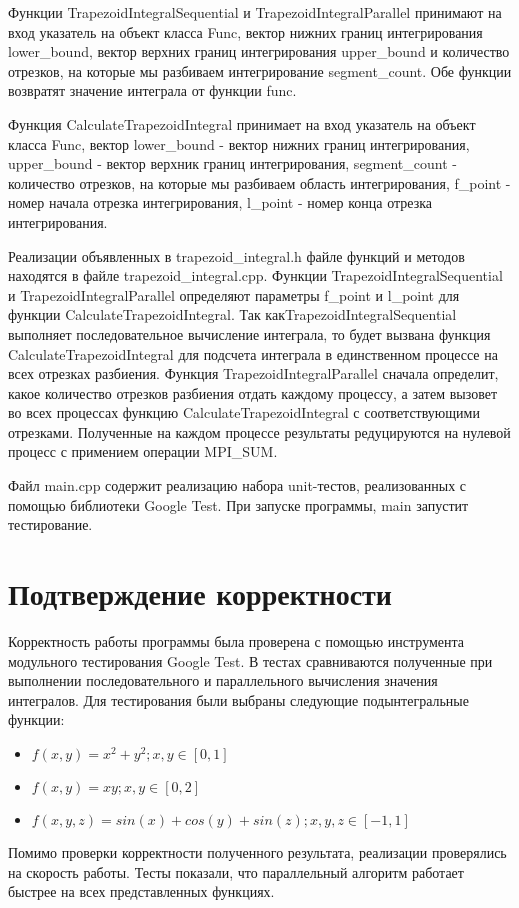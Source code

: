 \documentclass{report}
\begin{document}
Функции TrapezoidIntegralSequential и TrapezoidIntegralParallel принимают на вход указатель на объект класса Func, вектор нижних границ интегрирования lower\_bound, вектор верхних границ интегрирования upper\_bound и количество отрезков, на которые мы разбиваем интегрирование segment\_count. Обе функции возвратят значение интеграла от функции func.
\par Функция CalculateTrapezoidIntegral принимает на вход указатель на объект класса Func, вектор lower\_bound - вектор нижних границ интегрирования, upper\_bound - вектор верхник границ интегрирования, segment\_count - количество отрезков, на которые мы разбиваем область интегрирования, f\_point - номер начала отрезка интегрирования, l\_point - номер конца отрезка интегрирования.
\par Реализации объявленных в trapezoid\_integral.h файле функций и методов находятся в файле trapezoid\_integral.cpp. Функции TrapezoidIntegralSequential и TrapezoidIntegralParallel определяют параметры f\_point и l\_point для функции CalculateTrapezoidIntegral. Так как\break TrapezoidIntegralSequential выполняет последовательное вычисление интеграла, то будет вызвана функция CalculateTrapezoidIntegral для подсчета интеграла в единственном процессе на всех отрезках разбиения. Функция TrapezoidIntegralParallel сначала определит, какое количество отрезков разбиения отдать каждому процессу, а затем вызовет во всех процессах функцию CalculateTrapezoidIntegral с соответствующими отрезками. Полученные на каждом процессе результаты редуцируются на нулевой процесс с примением операции MPI\_SUM.
\par Файл main.cpp содержит реализацию набора unit-тестов, реализованных с помощью библиотеки Google Test. При запуске программы, main запустит тестирование.
\newpage

\section*{Подтверждение корректности}
\par Корректность работы программы была проверена с помощью инструмента модульного тестирования Google Test. В тестах сравниваются полученные при выполнении последовательного и параллельного вычисления значения интегралов. Для тестирования были выбраны следующие подынтегральные функции:
\begin{itemize}
  \item $f(x, y) = x^2 + y^2; x, y \in [0, 1]$
  \item $f(x, y) = xy; x, y \in [0, 2]$
  \item $f(x, y, z) = sin(x) + cos(y) + sin(z); x, y, z \in [-1, 1]$
\end{itemize}
\par Помимо проверки корректности полученного результата, реализации проверялись на скорость работы. Тесты показали, что параллельный алгоритм работает быстрее на всех представленных функциях.
\newpage
\end{document}
